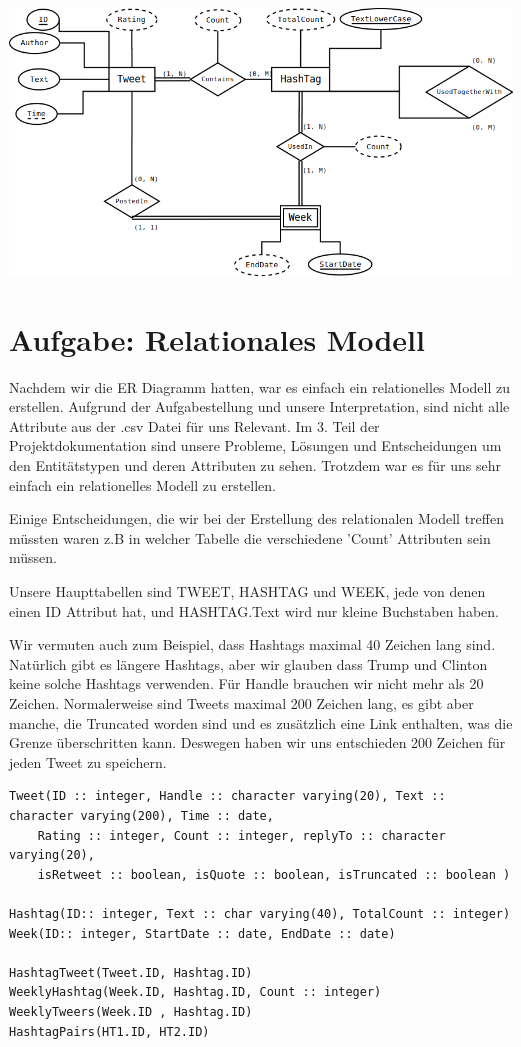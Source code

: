 \vspace{1cm}
\includegraphics[width=\textwidth]{ERDiagramm.png}

\section{Aufgabe: Relationales Modell}

Nachdem wir die ER Diagramm hatten, war es einfach ein relationelles Modell zu erstellen. Aufgrund der Aufgabestellung 
und unsere Interpretation, sind nicht alle Attribute aus der .csv Datei für uns Relevant. Im 3. Teil der Projektdokumentation
sind unsere Probleme, Lösungen und Entscheidungen um den Entitätstypen und deren Attributen zu sehen. Trotzdem war es 
für uns sehr einfach ein relationelles Modell zu erstellen.

Einige Entscheidungen, die wir bei der Erstellung des relationalen Modell treffen müssten waren z.B in welcher Tabelle die 
verschiedene 'Count' Attributen sein müssen.

Unsere Haupttabellen sind TWEET, HASHTAG und WEEK, jede von denen einen ID Attribut hat, und HASHTAG.Text wird nur kleine 
Buchstaben haben. 

Wir vermuten auch zum Beispiel, dass Hashtags maximal 40 Zeichen lang sind. Natürlich gibt es längere Hashtags, aber wir glauben 
dass Trump und Clinton keine solche Hashtags verwenden. Für Handle brauchen wir nicht mehr als 20 Zeichen. Normalerweise sind 
Tweets maximal 200 Zeichen lang, es gibt aber manche, die Truncated worden sind und es zusätzlich eine Link enthalten, was 
die Grenze überschritten kann. Deswegen haben wir uns entschieden 200 Zeichen für jeden Tweet zu speichern.

\begin{verbatim}
Tweet(ID :: integer, Handle :: character varying(20), Text :: character varying(200), Time :: date, 
    Rating :: integer, Count :: integer, replyTo :: character varying(20), 
    isRetweet :: boolean, isQuote :: boolean, isTruncated :: boolean )
    
Hashtag(ID:: integer, Text :: char varying(40), TotalCount :: integer)
Week(ID:: integer, StartDate :: date, EndDate :: date)

HashtagTweet(Tweet.ID, Hashtag.ID)
WeeklyHashtag(Week.ID, Hashtag.ID, Count :: integer)
WeeklyTweers(Week.ID , Hashtag.ID)
HashtagPairs(HT1.ID, HT2.ID)


\end{verbatim}

